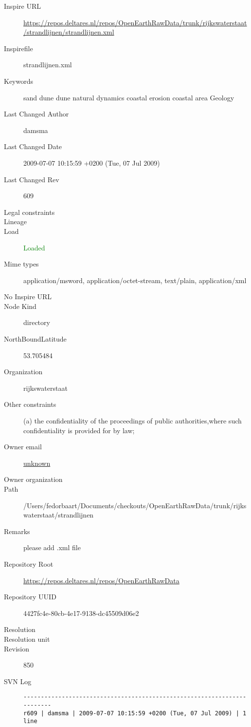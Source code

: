 \documentclass[9]{report}
\begin{document}
\begin{description}
  \item[Inspire URL] \href{https://repos.deltares.nl/repos/OpenEarthRawData/trunk/rijkswaterstaat/strandlijnen/strandlijnen.xml}{https://repos.deltares.nl/repos/OpenEarthRawData/trunk/rijkswaterstaat/strandlijnen/strandlijnen.xml}
  \item[Inspirefile] strandlijnen.xml
  \item[Keywords] sand dune dune natural dynamics coastal erosion coastal area Geology
  \item[Last Changed Author] damsma
  \item[Last Changed Date] 2009-07-07 10:15:59 +0200 (Tue, 07 Jul 2009)
  \item[Last Changed Rev] 609
  \item[Legal constraints] 
  \item[Lineage] 
  \item[Load] \textcolor{green}{Loaded}
  \item[Mime types] application/msword, application/octet-stream, text/plain, application/xml
  \item[No Inspire URL] 
  \item[Node Kind] directory
  \item[NorthBoundLatitude] 53.705484
  \item[Organization] rijkswaterstaat
  \item[Other constraints] (a) the confidentiality of the proceedings of public authorities,where such confidentiality is provided for by law;
  \item[Owner email] \href{mailto:unknown}{unknown}
  \item[Owner organization] 
  \item[Path] /Users/fedorbaart/Documents/checkouts/OpenEarthRawData/trunk/rijkswaterstaat/strandlijnen
  \item[Remarks] please add .xml file
  \item[Repository Root] \href{https://repos.deltares.nl/repos/OpenEarthRawData}{https://repos.deltares.nl/repos/OpenEarthRawData}
  \item[Repository UUID] 4427fc4e-80cb-4e17-9138-dc45509d06e2
  \item[Resolution] 
  \item[Resolution unit] 
  \item[Revision] 850
  \item[SVN Log] \begin{verbatim}
------------------------------------------------------------------------
r609 | damsma | 2009-07-07 10:15:59 +0200 (Tue, 07 Jul 2009) | 1 line


\end{verbatim}
\end{description}
\end{document}
